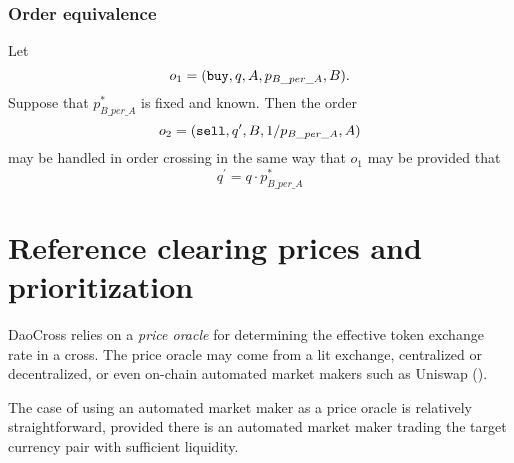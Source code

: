 \documentclass[11pt, reqno]{amsart}
\newcommand{\buy}{\textnormal{\texttt{buy}}}
\newcommand{\sell}{\textnormal{\texttt{sell}}}
\begin{document}
\subsubsection{Order equivalence}
Let
\[
	o_1 = (\buy, q, A, p_{B\_per\_A}, B).
\]
Suppose that $p^*_{B\_per\_A}$ is fixed and known. Then the order
\[
	o_2 = (\sell, q^\prime, B, 1 / p_{B\_per\_A}, A)
\]
may be handled in order crossing in the same way that $o_1$ may be
provided that
\[
	q^\prime = q \cdot p^*_{B\_per\_A}
\]

%
%
%

%
%


\section{Reference clearing prices and prioritization}
DaoCross relies on a \emph{price oracle} for determining the effective
token exchange rate in a cross. The price oracle may come from a lit
exchange, centralized or decentralized, or even on-chain automated market
makers such as Uniswap (\cite[\S 2.2]{AdZiRo20}).

The case of using an automated market maker as a price oracle is relatively
straightforward, provided there is an automated market maker trading the
target currency pair with sufficient liquidity.
\end{document}
